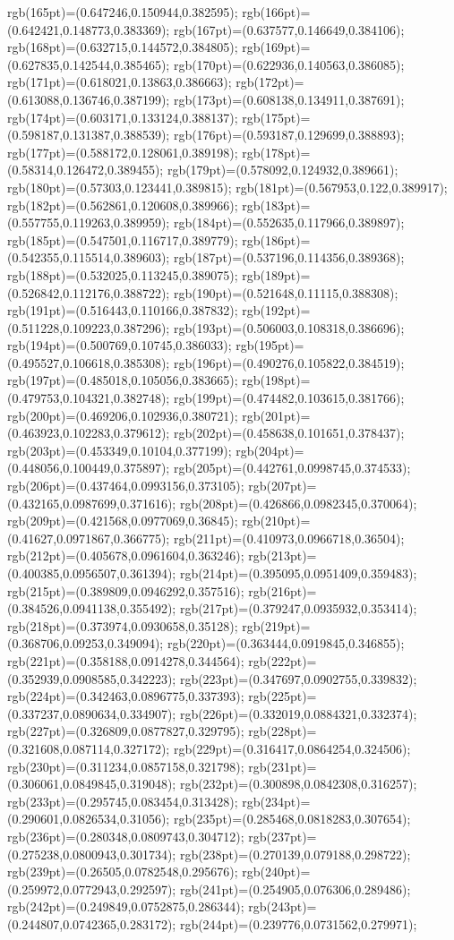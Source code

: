 rgb(165pt)=(0.647246,0.150944,0.382595); rgb(166pt)=(0.642421,0.148773,0.383369); rgb(167pt)=(0.637577,0.146649,0.384106); rgb(168pt)=(0.632715,0.144572,0.384805); rgb(169pt)=(0.627835,0.142544,0.385465); rgb(170pt)=(0.622936,0.140563,0.386085); rgb(171pt)=(0.618021,0.13863,0.386663); rgb(172pt)=(0.613088,0.136746,0.387199); rgb(173pt)=(0.608138,0.134911,0.387691); rgb(174pt)=(0.603171,0.133124,0.388137); rgb(175pt)=(0.598187,0.131387,0.388539); rgb(176pt)=(0.593187,0.129699,0.388893); rgb(177pt)=(0.588172,0.128061,0.389198); rgb(178pt)=(0.58314,0.126472,0.389455); rgb(179pt)=(0.578092,0.124932,0.389661); rgb(180pt)=(0.57303,0.123441,0.389815); rgb(181pt)=(0.567953,0.122,0.389917); rgb(182pt)=(0.562861,0.120608,0.389966); rgb(183pt)=(0.557755,0.119263,0.389959); rgb(184pt)=(0.552635,0.117966,0.389897); rgb(185pt)=(0.547501,0.116717,0.389779); rgb(186pt)=(0.542355,0.115514,0.389603); rgb(187pt)=(0.537196,0.114356,0.389368); rgb(188pt)=(0.532025,0.113245,0.389075); rgb(189pt)=(0.526842,0.112176,0.388722); rgb(190pt)=(0.521648,0.11115,0.388308); rgb(191pt)=(0.516443,0.110166,0.387832); rgb(192pt)=(0.511228,0.109223,0.387296); rgb(193pt)=(0.506003,0.108318,0.386696); rgb(194pt)=(0.500769,0.10745,0.386033); rgb(195pt)=(0.495527,0.106618,0.385308); rgb(196pt)=(0.490276,0.105822,0.384519); rgb(197pt)=(0.485018,0.105056,0.383665); rgb(198pt)=(0.479753,0.104321,0.382748); rgb(199pt)=(0.474482,0.103615,0.381766); rgb(200pt)=(0.469206,0.102936,0.380721); rgb(201pt)=(0.463923,0.102283,0.379612); rgb(202pt)=(0.458638,0.101651,0.378437); rgb(203pt)=(0.453349,0.10104,0.377199); rgb(204pt)=(0.448056,0.100449,0.375897); rgb(205pt)=(0.442761,0.0998745,0.374533); rgb(206pt)=(0.437464,0.0993156,0.373105); rgb(207pt)=(0.432165,0.0987699,0.371616); rgb(208pt)=(0.426866,0.0982345,0.370064); rgb(209pt)=(0.421568,0.0977069,0.36845); rgb(210pt)=(0.41627,0.0971867,0.366775); rgb(211pt)=(0.410973,0.0966718,0.36504); rgb(212pt)=(0.405678,0.0961604,0.363246); rgb(213pt)=(0.400385,0.0956507,0.361394); rgb(214pt)=(0.395095,0.0951409,0.359483); rgb(215pt)=(0.389809,0.0946292,0.357516); rgb(216pt)=(0.384526,0.0941138,0.355492); rgb(217pt)=(0.379247,0.0935932,0.353414); rgb(218pt)=(0.373974,0.0930658,0.35128); rgb(219pt)=(0.368706,0.09253,0.349094); rgb(220pt)=(0.363444,0.0919845,0.346855); rgb(221pt)=(0.358188,0.0914278,0.344564); rgb(222pt)=(0.352939,0.0908585,0.342223); rgb(223pt)=(0.347697,0.0902755,0.339832); rgb(224pt)=(0.342463,0.0896775,0.337393); rgb(225pt)=(0.337237,0.0890634,0.334907); rgb(226pt)=(0.332019,0.0884321,0.332374); rgb(227pt)=(0.326809,0.0877827,0.329795); rgb(228pt)=(0.321608,0.087114,0.327172); rgb(229pt)=(0.316417,0.0864254,0.324506); rgb(230pt)=(0.311234,0.0857158,0.321798); rgb(231pt)=(0.306061,0.0849845,0.319048); rgb(232pt)=(0.300898,0.0842308,0.316257); rgb(233pt)=(0.295745,0.083454,0.313428); rgb(234pt)=(0.290601,0.0826534,0.31056); rgb(235pt)=(0.285468,0.0818283,0.307654); rgb(236pt)=(0.280348,0.0809743,0.304712); rgb(237pt)=(0.275238,0.0800943,0.301734); rgb(238pt)=(0.270139,0.079188,0.298722); rgb(239pt)=(0.26505,0.0782548,0.295676); rgb(240pt)=(0.259972,0.0772943,0.292597); rgb(241pt)=(0.254905,0.076306,0.289486); rgb(242pt)=(0.249849,0.0752875,0.286344); rgb(243pt)=(0.244807,0.0742365,0.283172); rgb(244pt)=(0.239776,0.0731562,0.279971); 